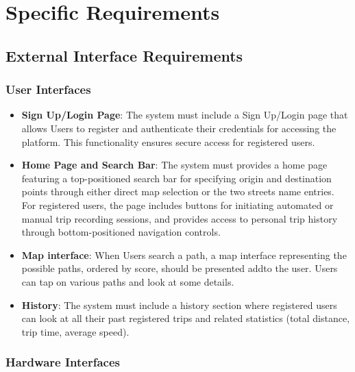 \chapter{Specific Requirements}
\label{ch:requirements}

\section{External Interface Requirements}
\label{sec:interfaces}

\subsection{User Interfaces}

\begin{itemize}
    \item \textbf{Sign Up/Login Page}: The system must include a Sign Up/Login page that allows Users to register and authenticate their credentials for accessing the platform. This functionality ensures secure access for registered users.

    \item \textbf{Home Page and Search Bar}: The system must provides a home page featuring a top-positioned search bar for specifying origin and destination points through either direct map selection or the two streets name entries. For registered users, the page includes buttons for initiating automated or manual trip recording sessions, and provides access to personal trip history through bottom-positioned navigation controls.

    \item \textbf{Map interface}: When Users search a path, a map interface representing the possible paths, ordered by score, should be presented addto the user. Users can tap on various paths and look at some details.

    \item \textbf{History}: The system must include a history section where registered users can look at all their past registered trips and related statistics (total distance, trip time, average speed).
\end{itemize}

\subsection{Hardware Interfaces}

